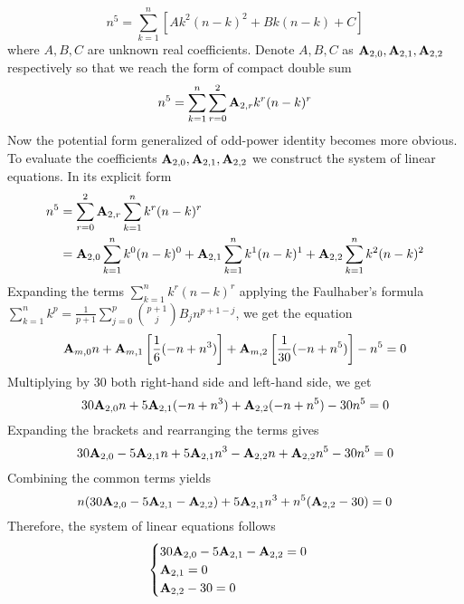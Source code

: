 \begin{equation*}
    n^5 = \sum_{k=1}^{n} \left[ A k^2(n-k)^2 + Bk(n-k) + C \right]
\end{equation*}
where $A,B,C$ are unknown real coefficients.
Denote $A,B,C$ as ${\mathbf{A}} \sb{2,0}, {\mathbf{A}} \sb{2,1}, {\mathbf{A}} \sb{2,2}$ respectively
so that we reach the form of compact double sum
\begin{equation*}
    n^5 = \sum_{k=1}^{n} \sum_{r=0}^{2} {\mathbf{A}} \sb{2,r} k^r (n-k)^r
\end{equation*}
Now the potential form generalized of odd-power identity becomes more obvious.
To evaluate the coefficients ${\mathbf{A}} \sb{2,0}, {\mathbf{A}} \sb{2,1}, {\mathbf{A}} \sb{2,2}$
we construct the system of linear equations.
In its explicit form
\begin{equation*}
    \begin{split}
        n^5 &= \sum_{r=0}^{2} {\mathbf{A}} \sb{2,r} \sum_{k=1}^{n} k^r (n-k)^r \\
        &= {\mathbf{A}} \sb{2,0} \sum_{k=1}^{n} k^0 (n-k)^0 + {\mathbf{A}} \sb{2,1} \sum_{k=1}^{n} k^1 (n-k)^1 + {\mathbf{A}} \sb{2,2} \sum_{k=1}^{n} k^2 (n-k)^2
    \end{split}
\end{equation*}
Expanding the terms $\sum_{k=1}^{n} k^r (n-k)^r$ applying the
Faulhaber's formula $\sum_{k=1}^{n}k^{p} = \frac{1}{p+1} \sum_{j=0}^{p} \binom{p+1}{j} B_{j} n^{p+1-j}$, we get the equation
\begin{equation*}
    {\mathbf{A}} \sb{m,0} n
    + {\mathbf{A}} \sb{m,1} \left[ \frac{1}{6} (-n + n^3) \right]
    + {\mathbf{A}} \sb{m,2} \left[ \frac{1}{30} (-n + n^5) \right] - n^5 = 0
\end{equation*}
Multiplying by $30$ both right-hand side and left-hand side, we get
\begin{equation*}
    30 {\mathbf{A}} \sb{2,0} n + 5 {\mathbf{A}} \sb{2,1} (-n + n^3) + {\mathbf{A}} \sb{2,2} (-n + n^5) - 30n^5 = 0
\end{equation*}
Expanding the brackets and rearranging the terms gives
\begin{equation*}
    30 {\mathbf{A}} \sb{2,0} - 5 {\mathbf{A}} \sb{2,1} n + 5 {\mathbf{A}} \sb{2,1} n^3 - {\mathbf{A}} \sb{2,2} n + {\mathbf{A}} \sb{2,2} n^5 - 30n^5 = 0
\end{equation*}
Combining the common terms yields
\begin{equation*}
    n (30 {\mathbf{A}} \sb{2,0} - 5 {\mathbf{A}} \sb{2,1} - {\mathbf{A}} \sb{2,2}) + 5 {\mathbf{A}} \sb{2,1} n^3 + n^5 ({\mathbf{A}} \sb{2,2} - 30) = 0
\end{equation*}
Therefore, the system of linear equations follows
\begin{equation*}
    \begin{cases}
        30 {\mathbf{A}} \sb{2,0} - 5 {\mathbf{A}} \sb{2,1} - {\mathbf{A}} \sb{2,2} = 0 \\
        {\mathbf{A}} \sb{2,1} = 0 \\
        {\mathbf{A}} \sb{2,2} - 30 = 0
    \end{cases}
\end{equation*}
